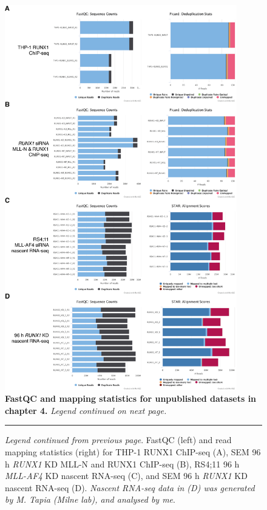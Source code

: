 \begin{figure}[p]
    \centering
    \includegraphics[width=0.9\textwidth,height=0.9\textheight,keepaspectratio]{figures/appendix/app_chapter4-qc.png}
    \caption[{FastQC and mapping statistics for unpublished datasets in chapter 4.}]
    {\textbf{FastQC and mapping statistics for unpublished datasets in chapter 4.} 
    \textit{Legend continued on next page.}
    }
    \label{fig:app_chapter4-qc}
\end{figure}
\clearpage

\begin{figure}[!b]
    \ContinuedFloat
    \hrule
    \vspace{5mm}
    \caption[]
    {\textit{Legend continued from previous page}. 
    FastQC (left) and read mapping statistics (right) for THP-1 RUNX1 ChIP-seq (A), SEM 96 h \textit{RUNX1} KD MLL-N and RUNX1 ChIP-seq (B), RS4;11 96 h \textit{MLL-AF4} KD nascent RNA-seq (C), and SEM 96 h \textit{RUNX1} KD nascent RNA-seq (D). \textit{Nascent RNA-seq data in (D) was generated by M. Tapia (Milne lab), and analysed by me}. 
    }
\end{figure}
\clearpage

